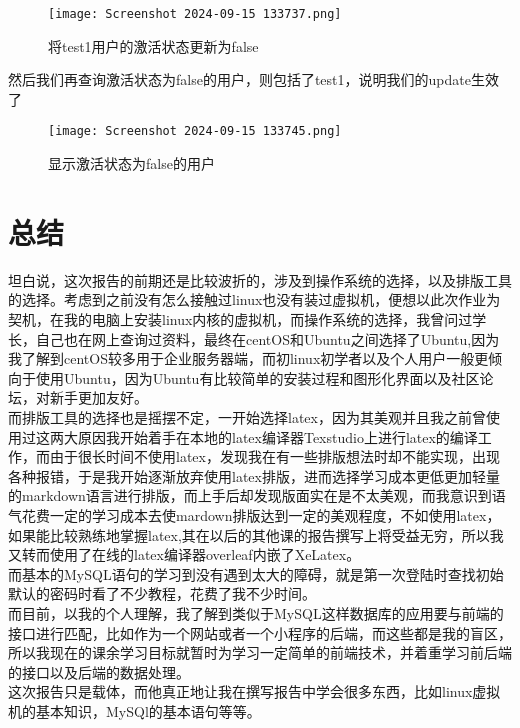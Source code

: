 \documentclass[12pt]{article}
\begin{document}
\begin{figure}[htbp]
    \centering
    \texttt{[image: Screenshot 2024-09-15 133737.png]}
    \caption{将test1用户的激活状态更新为false}
    \label{fig:enter-label}
\end{figure}

{\songti 然后我们再查询激活状态为false的用户，则包括了test1，说明我们的update生效了}

\begin{figure}[htbp]
    \centering
    \texttt{[image: Screenshot 2024-09-15 133745.png]}
    \caption{显示激活状态为false的用户}
    \label{fig:enter-label}
\end{figure}
\newpage
\section{总结}
{\songti 
    坦白说，这次报告的前期还是比较波折的，涉及到操作系统的选择，以及排版工具的选择。考虑到之前没有怎么接触过linux也没有装过虚拟机，便想以此次作业为契机，在我的电脑上安装linux内核的虚拟机，而操作系统的选择，我曾问过学长，自己也在网上查询过资料，最终在centOS和Ubuntu之间选择了Ubuntu,因为我了解到centOS较多用于企业服务器端，而初linux初学者以及个人用户一般更倾向于使用Ubuntu，因为Ubuntu有比较简单的安装过程和图形化界面以及社区论坛，对新手更加友好。\\
    
    而排版工具的选择也是摇摆不定，一开始选择latex，因为其美观并且我之前曾使用过这两大原因我开始着手在本地的latex编译器Texstudio上进行latex的编译工作，而由于很长时间不使用latex，发现我在有一些排版想法时却不能实现，出现各种报错，于是我开始逐渐放弃使用latex排版，进而选择学习成本更低更加轻量的markdown语言进行排版，而上手后却发现版面实在是不太美观，而我意识到语气花费一定的学习成本去使mardown排版达到一定的美观程度，不如使用latex，如果能比较熟练地掌握latex,其在以后的其他课的报告撰写上将受益无穷，所以我又转而使用了在线的latex编译器overleaf内嵌了XeLatex。\\
    
    而基本的MySQL语句的学习到没有遇到太大的障碍，就是第一次登陆时查找初始默认的密码时看了不少教程，花费了我不少时间。\\
    
    而目前，以我的个人理解，我了解到类似于MySQL这样数据库的应用要与前端的接口进行匹配，比如作为一个网站或者一个小程序的后端，而这些都是我的盲区，所以我现在的课余学习目标就暂时为学习一定简单的前端技术，并着重学习前后端的接口以及后端的数据处理。\\

    这次报告只是载体，而他真正地让我在撰写报告中学会很多东西，比如linux虚拟机的基本知识，MySQl的基本语句等等。
    
    


}
\end{document}
